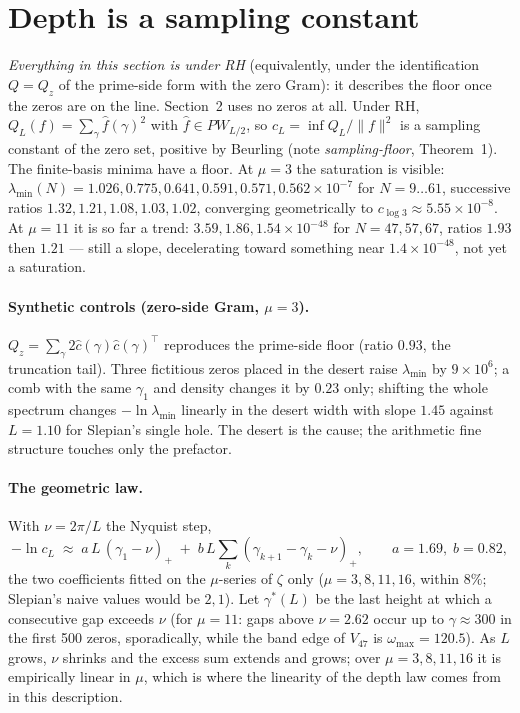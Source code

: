 \documentclass[11pt]{article}
\begin{document}
\section{Depth is a sampling constant}
\emph{Everything in this section is under RH} (equivalently, under the identification $Q=Q_z$ of the prime-side form with the zero Gram): it describes the floor once the zeros are on the line. Section~2 uses no zeros at all. Under RH, $Q_L(f)=\sum_\gamma\hat f(\gamma)^2$ with $\hat f\in PW_{L/2}$, so $c_L=\inf Q_L/\|f\|^2$ is a sampling constant of the zero set, positive by Beurling (note \emph{sampling-floor}, Theorem~1). The finite-basis minima have a floor. At $\mu=3$ the saturation is visible: $\lambda_{\min}(N)=1.026,0.775,0.641,0.591,0.571,0.562\times10^{-7}$ for $N=9\ldots61$, successive ratios $1.32,1.21,1.08,1.03,1.02$, converging geometrically to $c_{\log3}\approx5.55\times10^{-8}$. At $\mu=11$ it is so far a trend: $3.59,1.86,1.54\times10^{-48}$ for $N=47,57,67$, ratios $1.93$ then $1.21$ --- still a slope, decelerating toward something near $1.4\times10^{-48}$, not yet a saturation.

\paragraph{Synthetic controls (zero-side Gram, $\mu=3$).} $Q_z=\sum_\gamma2\hat c(\gamma)\hat c(\gamma)^{\!\top}$ reproduces the prime-side floor (ratio $0.93$, the truncation tail). Three fictitious zeros placed in the desert raise $\lambda_{\min}$ by $9\times10^6$; a comb with the same $\gamma_1$ and density changes it by $0.23$ only; shifting the whole spectrum changes $-\ln\lambda_{\min}$ linearly in the desert width with slope $1.45$ against $L=1.10$ for Slepian's single hole. The desert is the cause; the arithmetic fine structure touches only the prefactor.

\paragraph{The geometric law.} With $\nu=2\pi/L$ the Nyquist step,
\[
-\ln c_L\;\approx\;a\,L\,(\gamma_1-\nu)_+\;+\;b\,L\sum_k(\gamma_{k+1}-\gamma_k-\nu)_+,\qquad a=1.69,\;b=0.82,
\]
the two coefficients fitted on the $\mu$-series of $\zeta$ only ($\mu=3,8,11,16$, within $8\%$; Slepian's naive values would be $2,1$). Let $\gamma^*(L)$ be the last height at which a consecutive gap exceeds $\nu$ (for $\mu=11$: gaps above $\nu=2.62$ occur up to $\gamma\approx300$ in the first 500 zeros, sporadically, while the band edge of $V_{47}$ is $\omega_{\max}=120.5$). As $L$ grows, $\nu$ shrinks and the excess sum extends and grows; over $\mu=3,8,11,16$ it is empirically linear in $\mu$, which is where the linearity of the depth law comes from in this description.
\end{document}
